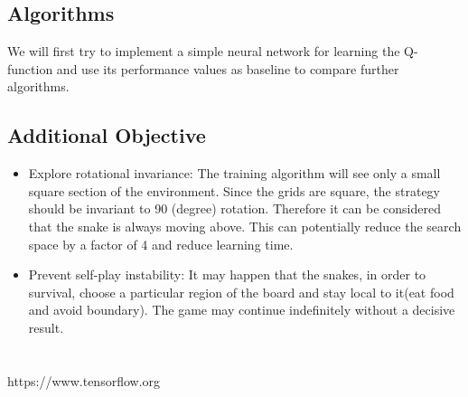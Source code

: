 \documentclass[conference]{IEEEtran}
\begin{document}
\subsection{Algorithms}
We will first try to implement a simple neural network for learning the Q-function and use its performance values as baseline to compare further algorithms.  \newline\par
   
   
\subsection{Additional Objective}
\begin{itemize}
	\item{Explore rotational invariance: The training algorithm will see only a small square section of the environment. Since the grids are square, the strategy should be invariant to 90 (degree) rotation. Therefore it can be considered that the snake is always moving above. This can potentially reduce the search space by a factor of 4 and reduce learning time.}
	\item{Prevent self-play instability: It may happen that the snakes, in order to survival, choose a particular region of the board and stay local to it(eat food and avoid boundary). The game may continue indefinitely without a decisive result. }
\end{itemize}
\section*{}

\begin{thebibliography}{00}
https://www.tensorflow.org
\end{thebibliography}
\end{document}
